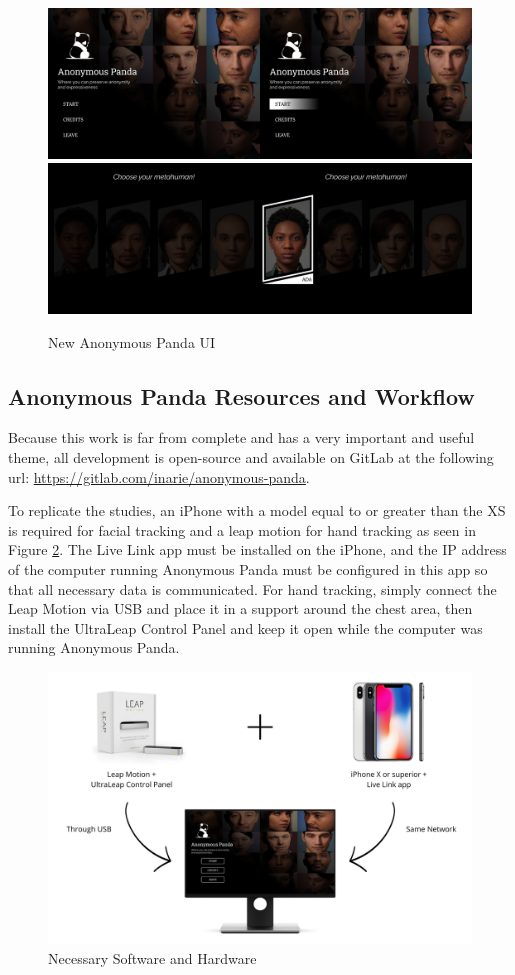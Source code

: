 \begin{figure}[!htb]
\includegraphics[width=\textwidth]{figures/startMenu.png}
\includegraphics[width=\textwidth]{figures/metahumanMenu.png}
\centering
\caption{New Anonymous Panda UI}
\label{fig:newUI}
\end{figure}

\subsection{Anonymous Panda Resources and Workflow}
Because this work is far from complete and has a very important and useful theme, all development is open-source and available on GitLab at the following url: \url{https://gitlab.com/inarie/anonymous-panda}.

To replicate the studies, an iPhone with a model equal to or greater than the XS is required for facial tracking and a leap motion for hand tracking as seen in Figure \ref{fig:setupChart}. The Live Link app must be installed on the iPhone, and the IP address of the computer running Anonymous Panda must be configured in this app so that all necessary data is communicated. For hand tracking, simply connect the Leap Motion via USB and place it in a support around the chest area, then install the UltraLeap Control Panel and keep it open while the computer was running Anonymous Panda.

\begin{figure}[!htb]
\centering
\includegraphics[width=\linewidth]{figures/setupChart.png}
\caption{Necessary Software and Hardware}
\label{fig:setupChart}
\end{figure}
